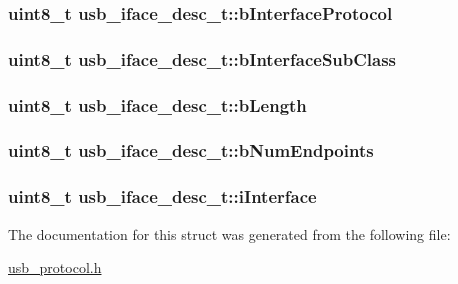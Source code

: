 \label{structusb__iface__desc__t_a7e39e94123157feab346546e3034d166}
\hypertarget{structusb__iface__desc__t_a3f8436d03bdd0ca6691c3ead758b9f4a}{
\subsubsection[{b\-Interface\-Protocol}]{\setlength{\rightskip}{0pt plus 5cm}uint8\-\_\-t {\bf usb\-\_\-iface\-\_\-desc\-\_\-t\-::b\-Interface\-Protocol}}}
\label{structusb__iface__desc__t_a3f8436d03bdd0ca6691c3ead758b9f4a}
\hypertarget{structusb__iface__desc__t_a023635bd8337ab81717bae41de80ff06}{
\subsubsection[{b\-Interface\-Sub\-Class}]{\setlength{\rightskip}{0pt plus 5cm}uint8\-\_\-t {\bf usb\-\_\-iface\-\_\-desc\-\_\-t\-::b\-Interface\-Sub\-Class}}}
\label{structusb__iface__desc__t_a023635bd8337ab81717bae41de80ff06}
\hypertarget{structusb__iface__desc__t_ac1a5ca3d8e481aabfabfecb92727eede}{
\subsubsection[{b\-Length}]{\setlength{\rightskip}{0pt plus 5cm}uint8\-\_\-t {\bf usb\-\_\-iface\-\_\-desc\-\_\-t\-::b\-Length}}}
\label{structusb__iface__desc__t_ac1a5ca3d8e481aabfabfecb92727eede}
\hypertarget{structusb__iface__desc__t_aae7be1499654d689018b8c450b86f574}{
\subsubsection[{b\-Num\-Endpoints}]{\setlength{\rightskip}{0pt plus 5cm}uint8\-\_\-t {\bf usb\-\_\-iface\-\_\-desc\-\_\-t\-::b\-Num\-Endpoints}}}
\label{structusb__iface__desc__t_aae7be1499654d689018b8c450b86f574}
\hypertarget{structusb__iface__desc__t_a44cb19ca24e0659fcb3fa7e2522711bb}{
\subsubsection[{i\-Interface}]{\setlength{\rightskip}{0pt plus 5cm}uint8\-\_\-t {\bf usb\-\_\-iface\-\_\-desc\-\_\-t\-::i\-Interface}}}
\label{structusb__iface__desc__t_a44cb19ca24e0659fcb3fa7e2522711bb}


\-The documentation for this struct was generated from the following file\-:\begin{DoxyCompactItemize}
\item 
\hyperlink{usb__protocol_8h}{usb\-\_\-protocol.\-h}\end{DoxyCompactItemize}
